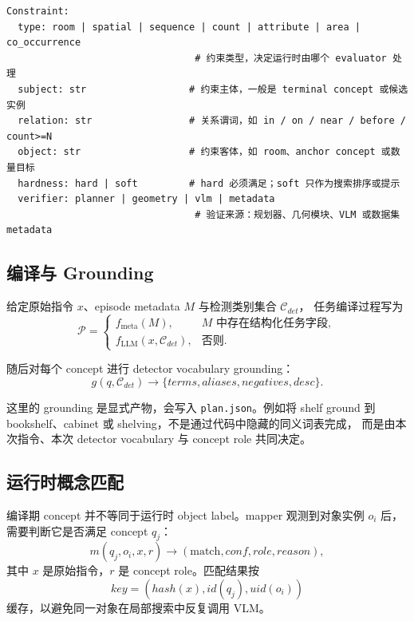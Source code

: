 \documentclass[UTF8,zihao=-4]{ctexart}
\begin{document}
\begin{lstlisting}[style=pseudo,caption={Constraint 的核心字段}]
Constraint:
  type: room | spatial | sequence | count | attribute | area | co_occurrence
                                 # 约束类型，决定运行时由哪个 evaluator 处理
  subject: str                  # 约束主体，一般是 terminal concept 或候选实例
  relation: str                 # 关系谓词，如 in / on / near / before / count>=N
  object: str                   # 约束客体，如 room、anchor concept 或数量目标
  hardness: hard | soft         # hard 必须满足；soft 只作为搜索排序或提示
  verifier: planner | geometry | vlm | metadata
                                 # 验证来源：规划器、几何模块、VLM 或数据集 metadata
\end{lstlisting}

\subsection{编译与 Grounding}

给定原始指令 $x$、episode metadata $M$ 与检测类别集合 $\mathcal{C}_{det}$，
任务编译过程写为
\begin{equation}
  \mathcal{P} =
  \begin{cases}
  f_{\mathrm{meta}}(M), & M \text{ 中存在结构化任务字段},\\
  f_{\mathrm{LLM}}(x,\mathcal{C}_{det}), & \text{否则}.
  \end{cases}
  \label{eq:plan_compile}
\end{equation}

随后对每个 concept 进行 detector vocabulary grounding：
\begin{equation}
  g(q,\mathcal{C}_{det})
  \rightarrow
  \{terms, aliases, negatives, desc\}.
  \label{eq:concept_grounding}
\end{equation}

这里的 grounding 是显式产物，会写入 \texttt{plan.json}。例如将 shelf
ground 到 bookshelf、cabinet 或 shelving，不是通过代码中隐藏的同义词表完成，
而是由本次指令、本次 detector vocabulary 与 concept role 共同决定。

\subsection{运行时概念匹配}

编译期 concept 并不等同于运行时 object label。mapper 观测到对象实例 $o_i$ 后，
需要判断它是否满足 concept $q_j$：
\begin{equation}
  m(q_j,o_i,x,r)
  \rightarrow
  (\mathrm{match}, conf, role, reason),
  \label{eq:runtime_match}
\end{equation}
其中 $x$ 是原始指令，$r$ 是 concept role。匹配结果按
\begin{equation}
  key=(hash(x), id(q_j), uid(o_i))
\end{equation}
缓存，以避免同一对象在局部搜索中反复调用 VLM。
\end{document}
